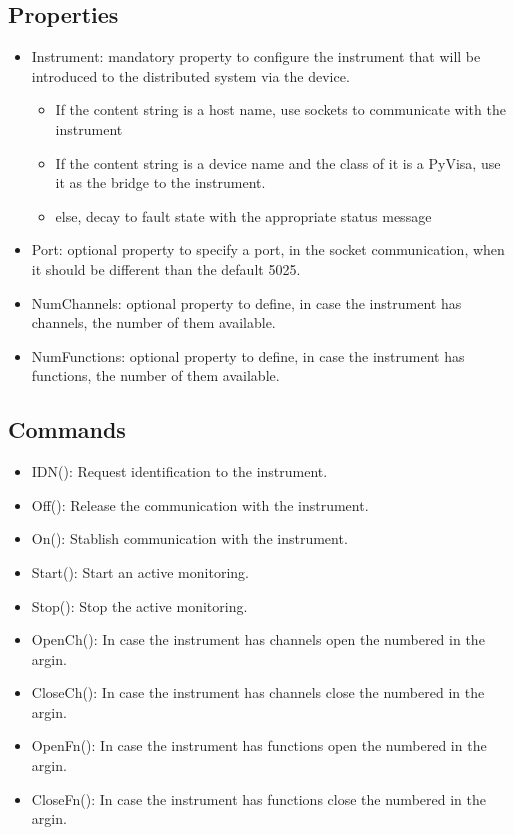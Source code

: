 \documentclass[a4paper,10pt]{article}
\begin{document}
\subsection{Properties}

\begin{itemize}
    \item Instrument: mandatory property to configure the instrument that will be introduced to the distributed system via the device.
    \begin{itemize}
        \item If the content string is a host name, use sockets to communicate with the instrument
        \item If the content string is a device name and the class of it is a PyVisa, use it as the bridge to the instrument.
        \item else, decay to fault state with the appropriate status message
    \end{itemize}
    \item Port: optional property to specify a port, in the socket communication, when it should be different than the default 5025.
    \item NumChannels: optional property to define, in case the instrument has channels, the number of them available.
    \item NumFunctions: optional property to define, in case the instrument has functions, the number of them available.
\end{itemize}

\subsection{Commands}

\begin{itemize}
    \item IDN(): Request identification to the instrument.
    \item Off(): Release the communication with the instrument.
    \item On(): Stablish communication with the instrument.
    \item Start(): Start an active monitoring.
    \item Stop(): Stop the active monitoring.
    \item OpenCh(): In case the instrument has channels open the numbered in the argin.
    \item CloseCh(): In case the instrument has channels close the numbered in the argin.
    \item OpenFn(): In case the instrument has functions open the numbered in the argin.
    \item CloseFn(): In case the instrument has functions close the numbered in the argin.
\end{itemize}
\end{document}
